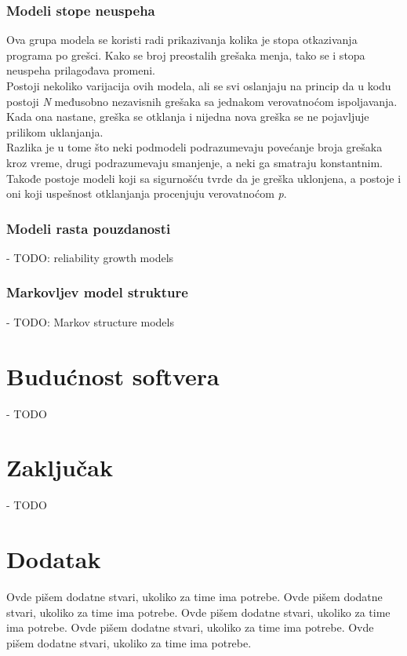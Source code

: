 \documentclass[a4paper]{article}
\begin{document}
\subsubsection{Modeli stope neuspeha}
\label{subsec:stopa_neuspeha}

Ova grupa modela se koristi radi prikazivanja kolika je stopa otkazivanja programa po grešci. Kako se broj preostalih grešaka menja, tako se i stopa neuspeha prilagođava promeni.\\
Postoji nekoliko varijacija ovih modela, ali se svi oslanjaju na princip da u kodu postoji \textit{N} međusobno nezavisnih grešaka sa jednakom verovatnoćom ispoljavanja. Kada ona nastane, greška se otklanja i nijedna nova greška se ne pojavljuje prilikom uklanjanja.\\
Razlika je u tome što neki podmodeli podrazumevaju povećanje broja grešaka kroz vreme, drugi podrazumevaju smanjenje, a neki ga smatraju konstantnim. Takođe postoje modeli koji sa sigurnošću tvrde da je greška uklonjena, a postoje i oni koji uspešnost otklanjanja procenjuju verovatnoćom \textit{p}.

\subsubsection{Modeli rasta pouzdanosti}
\label{subsec:rast_pouzdanosti}

- TODO: reliability growth models

\subsubsection{Markovljev model strukture}
\label{subsec:markov}
- TODO: Markov structure models


\section{Budućnost softvera}
\label{buducnost}

- TODO \\

\section{Zaključak}
\label{sec:zakljucak}

- TODO \\

\appendix
 


\appendix
\section{Dodatak}
Ovde pišem dodatne stvari, ukoliko za time ima potrebe.
Ovde pišem dodatne stvari, ukoliko za time ima potrebe.
Ovde pišem dodatne stvari, ukoliko za time ima potrebe.
Ovde pišem dodatne stvari, ukoliko za time ima potrebe.
Ovde pišem dodatne stvari, ukoliko za time ima potrebe.
\end{document}
